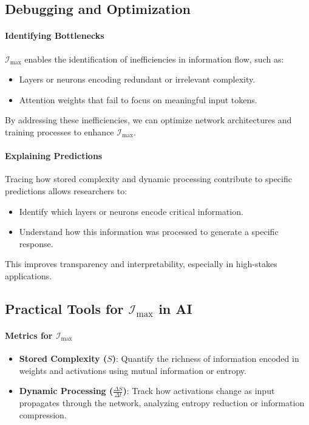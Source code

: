 \documentclass[12pt]{article}
\begin{document}
\subsection{Debugging and Optimization}

\paragraph{Identifying Bottlenecks}
\(\mathcal{I}_{\text{max}}\) enables the identification of inefficiencies in information flow, such as:
\begin{itemize}
    \item Layers or neurons encoding redundant or irrelevant complexity.
    \item Attention weights that fail to focus on meaningful input tokens.
\end{itemize}
By addressing these inefficiencies, we can optimize network architectures and training processes to enhance \(\mathcal{I}_{\text{max}}\).

\paragraph{Explaining Predictions}
Tracing how stored complexity and dynamic processing contribute to specific predictions allows researchers to:
\begin{itemize}
    \item Identify which layers or neurons encode critical information.
    \item Understand how this information was processed to generate a specific response.
\end{itemize}
This improves transparency and interpretability, especially in high-stakes applications.

\subsection{Practical Tools for \(\mathcal{I}_{\text{max}}\) in AI}

\paragraph{Metrics for \(\mathcal{I}_{\text{max}}\)}
\begin{itemize}
    \item \textbf{Stored Complexity (\(S\))}: Quantify the richness of information encoded in weights and activations using mutual information or entropy.
    \item \textbf{Dynamic Processing (\(\frac{\Delta S}{\Delta t}\))}: Track how activations change as input propagates through the network, analyzing entropy reduction or information compression.
\end{itemize}
\end{document}
